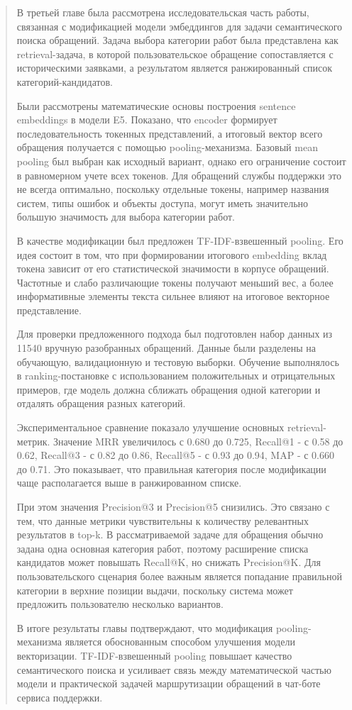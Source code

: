 \begin{quote}
В третьей главе была рассмотрена исследовательская часть работы,
связанная с модификацией модели эмбеддингов для задачи семантического
поиска обращений. Задача выбора категории работ была представлена как
retrieval-задача, в которой пользовательское обращение сопоставляется с
историческими заявками, а результатом является ранжированный список
категорий-кандидатов.

Были рассмотрены математические основы построения sentence embeddings в
модели E5. Показано, что encoder формирует последовательность токенных
представлений, а итоговый вектор всего обращения получается с помощью
pooling-механизма. Базовый mean pooling был выбран как исходный вариант,
однако его ограничение состоит в равномерном учете всех токенов. Для
обращений службы поддержки это не всегда оптимально, поскольку отдельные
токены, например названия систем, типы ошибок и объекты доступа, могут
иметь значительно большую значимость для выбора категории работ.

В качестве модификации был предложен TF-IDF-взвешенный pooling. Его идея
состоит в том, что при формировании итогового embedding вклад токена
зависит от его статистической значимости в корпусе обращений. Частотные
и слабо различающие токены получают меньший вес, а более информативные
элементы текста сильнее влияют на итоговое векторное представление.

Для проверки предложенного подхода был подготовлен набор данных из 11540
вручную разобранных обращений. Данные были разделены на обучающую,
валидационную и тестовую выборки. Обучение выполнялось в
ranking-постановке с использованием положительных и отрицательных
примеров, где модель должна сближать обращения одной категории и
отдалять обращения разных категорий.

Экспериментальное сравнение показало улучшение основных
retrieval-метрик. Значение MRR увеличилось с 0.680 до 0.725, Recall@1 -
с 0.58 до 0.62, Recall@3 - с 0.82 до 0.86, Recall@5 - с 0.93 до 0.94,
MAP - с 0.660 до 0.71. Это показывает, что правильная категория после
модификации чаще располагается выше в ранжированном списке.

При этом значения Precision@3 и Precision@5 снизились. Это связано с
тем, что данные метрики чувствительны к количеству релевантных
результатов в top-k. В рассматриваемой задаче для обращения обычно
задана одна основная категория работ, поэтому расширение списка
кандидатов может повышать Recall@K, но снижать Precision@K. Для
пользовательского сценария более важным является попадание правильной
категории в верхние позиции выдачи, поскольку система может предложить
пользователю несколько вариантов.

В итоге результаты главы подтверждают, что модификация pooling-механизма
является обоснованным способом улучшения модели векторизации.
TF-IDF-взвешенный pooling повышает качество семантического поиска и
усиливает связь между математической частью модели и практической
задачей маршрутизации обращений в чат-боте сервиса поддержки.
\end{quote}

